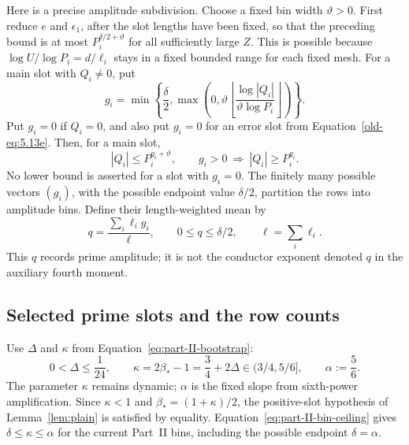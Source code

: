 \documentclass[11pt,a4paper]{article}
\numberwithin{equation}{section}
\numberwithin{figure}{section}
\theoremstyle{definition}
\theoremstyle{remark}
\begin{document}
Here is a precise amplitude subdivision.  Choose a fixed bin width
\(\vartheta>0\).  First reduce \(e\) and \(\epsilon_1\), after the
slot lengths have been fixed, so that the preceding bound is at
most \(P_i^{\delta/2+\vartheta}\) for all sufficiently large \(Z\).
This is possible because
\(\log U/\log P_i=d/\ell_i\) stays in a fixed bounded range for
each fixed mesh.  For a main slot with \(Q_i\ne0\), put
\[
 g_i=\min\left\{\frac{\delta}{2},
   \max\left(0,\vartheta
     \left\lfloor\frac{\log|Q_i|}{\vartheta\log P_i}\right\rfloor
   \right)\right\}.
\]
Put \(g_i=0\) if \(Q_i=0\), and also put \(g_i=0\) for an error
slot from Equation~\eqref{old-eq:5.13e}.  Then, for a main slot,
\[
 |Q_i|\le P_i^{g_i+\vartheta},\qquad
 g_i>0\ \Longrightarrow\ |Q_i|\ge P_i^{g_i}.
\]
No lower bound is asserted for a slot with \(g_i=0\).
The finitely many possible vectors \((g_i)\), with the possible
endpoint value \(\delta/2\), partition the rows into amplitude
bins.  Define their length-weighted mean by
\begin{equation}
 q=\frac{\sum_i\ell_i g_i}{\ell},\qquad
 0\le q\le\delta/2,\qquad \ell=\sum_i\ell_i.
 \label{old-eq:6.6}
\end{equation}
This \(q\) records prime amplitude; it is not the conductor
exponent denoted \(q\) in the auxiliary fourth moment.

\subsection{Selected prime slots and the row counts}\label{sec:selection}

Use \(\Delta\) and \(\kappa\) from Equation~\eqref{eq:part-II-bootstrap}:
\[
 0<\Delta\le\frac1{24},\qquad
 \kappa=2\beta_*-1=\frac34+2\Delta\in(3/4,5/6],\qquad
 \alpha:=\frac56.
\]
The parameter \(\kappa\) remains dynamic; \(\alpha\) is the fixed slope
from sixth-power amplification.  Since \(\kappa<1\) and
\(\beta_*=(1+\kappa)/2\), the positive-slot hypothesis of
Lemma~\ref{lem:plain} is satisfied by equality.  Equation~\eqref{eq:part-II-bin-ceiling}
gives \(\delta\le\kappa\le\alpha\) for the current Part~II bins, including
the possible endpoint \(\delta=\alpha\).
\end{document}
